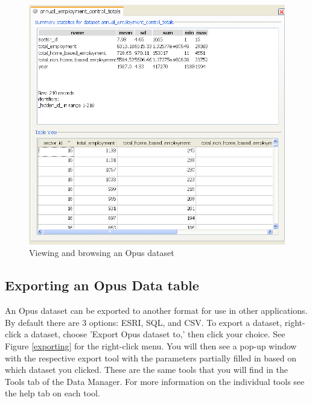 \begin{figure}[htp]
\begin{center}
\includegraphics[scale=0.5]{part-gui/images/data-manager-opus-data-tab-view-dataset-tab.png}
\end{center}
\caption{Viewing and browsing an Opus dataset}
\label{view-and-browse}
\end{figure}

\subsection{Exporting an Opus Data table}
An Opus dataset can be exported to another format for use in other applications.  By default there are 3 options: ESRI, SQL, and CSV.  To export a dataset, right-click a dataset, choose 'Export Opus dataset to,' then click your choice.  See Figure \ref{exporting} for the right-click menu.  You will then see a pop-up window with the respective export tool with the parameters partially filled in based on which dataset you clicked.  These are the same tools that you will find in the Tools tab of the Data Manager.  For more information on the individual tools see the help tab on each tool.

